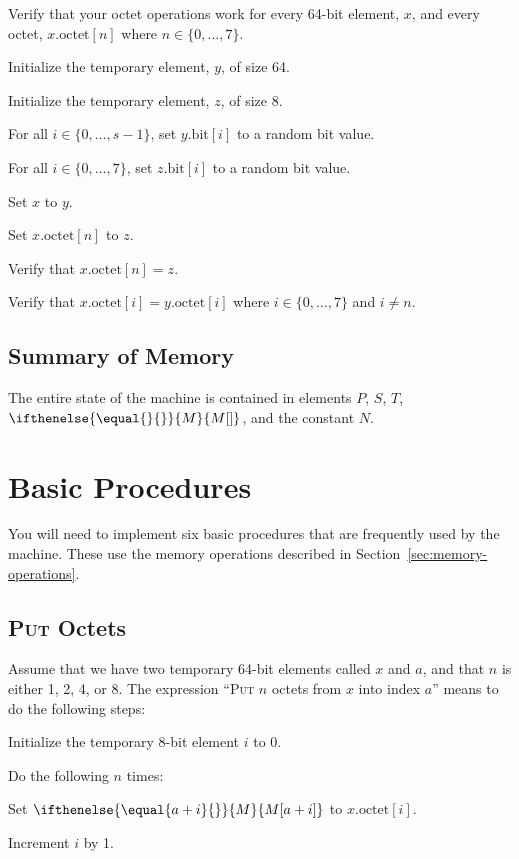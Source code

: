 \documentclass[a4paper,12pt]{article}
\newcommand{\MEM}[1]{\ifthenelse{\equal{#1}{}}{M}{M[#1]}}
\newcommand{\PC}{P}
\newcommand{\SP}{S}
\newcommand{\TERM}{T}
\newcommand{\octno}[2]{#1.\mathrm{octet}[#2]}
\newcommand{\bitno}[2]{#1.\mathrm{bit}[#2]}
\newcommand{\range}[2]{\{#1,\ldots,#2\}}
\newcommand{\proc}[1]{\textsc{#1}}
\begin{document}
Verify that your octet operations work for every 64-bit element, $x$, and every octet, $\octno{x}{n}$ where $n \in \range{0}{7}$.
\begin{stepnumbers}
\item Initialize the temporary element, $y$, of size 64.
\item Initialize the temporary element, $z$, of size 8.
\item For all $i \in \range{0}{s-1}$, set $\bitno{y}{i}$ to a random bit value.
\item For all $i \in \range{0}{7}$, set $\bitno{z}{i}$ to a random bit value.
\item Set $x$ to $y$.
\item Set $\octno{x}{n}$ to $z$.
\item Verify that $\octno{x}{n} = z$.
\item Verify that $\octno{x}{i} = \octno{y}{i}$ where $i \in \range{0}{7}$ and $i \neq n$.
\end{stepnumbers}

\subsection{Summary of Memory}

The entire state of the machine is contained in elements $\PC$, $\SP$, $\TERM$, $\MEM{}$, and the constant $N$.

\section{Basic Procedures}

You will need to implement six basic procedures that are frequently used by the machine.
These use the memory operations described in Section~\ref{sec:memory-operations}.

\subsection{\proc{Put} Octets}

Assume that we have two temporary 64-bit elements called $x$ and $a$, and that $n$ is either 1, 2, 4, or 8.
The expression ``\proc{Put} $n$ octets from $x$ into index $a$'' means to do the following steps:
\begin{stepnumbers}
\item Initialize the temporary 8-bit element $i$ to 0.
\item Do the following $n$ times:
  \begin{stepletters}
  \item Set $\MEM{a+i}$ to $\octno{x}{i}$.
  \item Increment $i$ by 1.
  \end{stepletters}
\end{stepnumbers}
\end{document}
